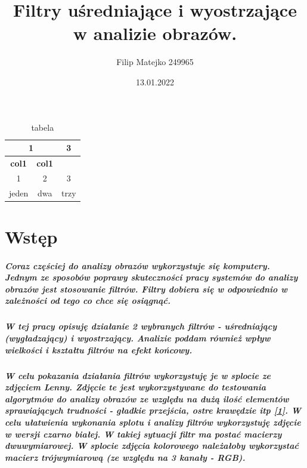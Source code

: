 \documentclass[a4paper,12pt,openany]{report}
\begin{document}
\title{\Large{\textbf{Filtry uśredniające i wyostrzające w analizie obrazów.}}}
\author{Filip Matejko 249965}
\date{13.01.2022}
\maketitle

\tableofcontents


\begin{table}
\centering
\begin{tabular}{@{}*3c@{}}
\multicolumn{2}{c}{1} &
\multicolumn{1}{c}{3}\\
\hline
\textbf{col1} & \textbf{col1} & \\
\hline
1 & 2 & 3 \\
\hline
jeden & dwa & trzy \\
\hline
\end{tabular}
\caption{tabela}
\end{table}



\chapter{Wstęp}

\paragraph{\indent Coraz częściej do analizy obrazów wykorzystuje się komputery. Jednym ze sposobów poprawy skuteczności pracy systemów do analizy obrazów jest stosowanie filtrów. Filtry dobiera się w odpowiednio w zależności od tego co chce się osiągnąć.}

\paragraph{\indent W tej pracy opisuję działanie 2 wybranych filtrów - uśredniający (wygładzający) i wyostrzający. Analizie poddam również wpływ wielkości i kształtu filtrów na efekt końcowy.}

\paragraph{\indent W celu pokazania działania filtrów wykorzystuję je w splocie ze zdjęciem Lenny. Zdjęcie te jest wykorzystywane do testowania algorytmów do analizy obrazów ze względu na dużą ilość elementów sprawiających trudności - gładkie przejścia, ostre krawędzie itp \href{https://en.wikipedia.org/wiki/Lenna}{[1]}. W celu ułatwienia wykonania splotu i analizy filtrów wykorzystuję zdjęcie w wersji czarno białej. W takiej sytuacji filtr ma postać macierzy dwuwymiarowej. W splocie zdjęcia kolorowego należałoby wykorzystać macierz trójwymiarową (ze względu na 3 kanały - RGB).}
\end{document}
